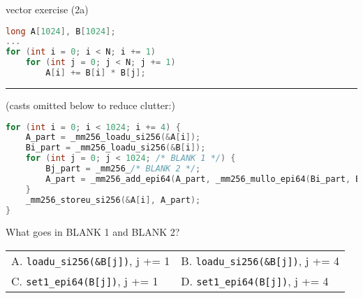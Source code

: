 \begin{frame}[fragile,label=vectorExercise2A]{vector exercise (2a)}
\begin{lstlisting}[language=C++,style=smaller]
long A[1024], B[1024];
...
for (int i = 0; i < N; i += 1)
    for (int j = 0; j < N; j += 1)
        A[i] += B[i] * B[j];
\end{lstlisting}
\hrule
{\fontsize{9}{10}\selectfont (casts omitted below to reduce clutter:)}
\begin{lstlisting}[language=C++,style=smaller]
for (int i = 0; i < 1024; i += 4) {
    A_part = _mm256_loadu_si256(&A[i]);
    Bi_part = _mm256_loadu_si256(&B[i]);
    for (int j = 0; j < 1024; /* BLANK 1 */) {
        Bj_part = _mm256_/* BLANK 2 */;
        A_part = _mm256_add_epi64(A_part, _mm256_mullo_epi64(Bi_part, Bj_part));
    }
    _mm256_storeu_si256(&A[i], A_part);
}
\end{lstlisting}
\small
What goes in BLANK 1 and BLANK 2? \\
\begin{tabular}{ll}
A. {\small\tt loadu\_si256(\&B[j])}, j += 1 & B. {\small\tt loadu\_si256(\&B[j])}, j += 4 \\
C. {\small \tt set1\_epi64(B[j])}, j += 1 & D. {\small\tt set1\_epi64(B[j])}, j += 4 \\
\end{tabular}
\end{frame}
